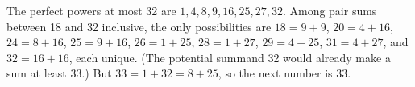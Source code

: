 The perfect powers at most 32 are $1,4,8,9,16,25,27,32$. Among pair sums between 18 and 32 inclusive, the only possibilities are $18=9+9$, $20=4+16$, $24=8+16$, $25=9+16$, $26=1+25$, $28=1+27$, $29=4+25$, $31=4+27$, and $32=16+16$, each unique. (The potential summand 32 would already make a sum at least 33.) But $33=1+32=8+25$, so the next number is $\boxed{33}$.
